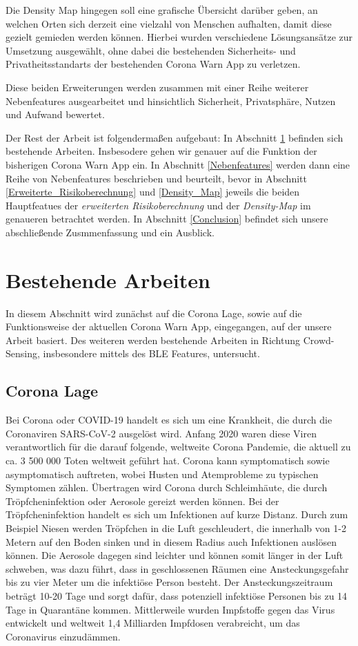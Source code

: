 \documentclass[conference,compsoc]{IEEEtran}
\begin{document}
Die Density Map hingegen soll eine grafische Übersicht darüber geben, an welchen Orten sich derzeit eine vielzahl von Menschen aufhalten, damit diese gezielt gemieden werden können. 
Hierbei wurden verschiedene Lösungsansätze zur Umsetzung ausgewählt, ohne dabei die bestehenden Sicherheits- und Privatheitsstandarts der bestehenden Corona Warn App zu verletzen. 

Diese beiden Erweiterungen werden zusammen mit einer Reihe weiterer Nebenfeatures ausgearbeitet und hinsichtlich Sicherheit, Privatsphäre, Nutzen und Aufwand bewertet. 

Der Rest der Arbeit ist folgendermaßen aufgebaut: In Abschnitt \ref{rel_work} befinden sich bestehende Arbeiten. 
Insbesodere gehen wir genauer auf die Funktion der bisherigen Corona Warn App ein. 
In Abschnitt \ref{Nebenfeatures} werden dann eine Reihe von Nebenfeatures beschrieben und beurteilt,
bevor in Abschnitt \ref{Erweiterte_Risikoberechnung} und \ref{Density_Map} jeweils die beiden Hauptfeatues der \textit{erweiterten Risikoberechnung} und der \textit{Density-Map} im genaueren betrachtet werden. 
In Abschnitt \ref{Conclusion} befindet sich unsere abschließende Zusmmenfassung und ein Ausblick. 

\section{Bestehende Arbeiten} \label{rel_work}

In diesem Abschnitt wird zunächst auf die Corona Lage, sowie auf die Funktionsweise der aktuellen Corona Warn App, eingegangen, auf der unsere Arbeit basiert. 
Des weiteren werden  bestehende Arbeiten in Richtung Crowd-Sensing, insbesondere mittels des BLE Features, untersucht. 
\subsection{Corona Lage}
Bei Corona oder COVID-19 handelt es sich um eine Krankheit, die durch die Coronaviren SARS-CoV-2 ausgelöst wird. 
Anfang 2020 waren diese Viren verantwortlich für die darauf folgende, weltweite Corona Pandemie, die aktuell zu ca. 3 500 000 Toten weltweit geführt hat. 
Corona kann symptomatisch sowie asymptomatisch auftreten, wobei Husten und Atemprobleme zu typischen Symptomen zählen.
Übertragen wird Corona durch Schleimhäute, die durch Tröpfcheninfektion oder Aerosole gereizt werden können.
Bei der Tröpfcheninfektion handelt es sich um Infektionen auf kurze Distanz. Durch zum Beispiel Niesen werden Tröpfchen in die Luft geschleudert, 
die innerhalb von 1-2 Metern auf den Boden sinken und in diesem Radius auch Infektionen auslösen können. 
Die Aerosole dagegen sind leichter und können somit länger in der Luft schweben, 
was dazu führt, dass in geschlossenen Räumen eine Ansteckungsgefahr bis zu vier Meter um die infektiöse Person besteht. 
Der Ansteckungszeitraum beträgt 10-20 Tage und sorgt dafür, dass potenziell infektiöse Personen bis zu 14 Tage in Quarantäne kommen.
Mittlerweile wurden Impfstoffe gegen das Virus entwickelt und weltweit 1,4 Milliarden Impfdosen verabreicht, um das Coronavirus einzudämmen.
\end{document}
